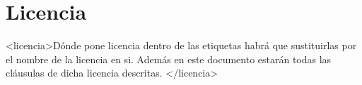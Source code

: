 \chapter{Licencia}
\label{chap:licencia}


<licencia>Dónde pone licencia dentro de las etiquetas habrá que sustituirlas por el nombre de la licencia en si. Además en este documento estarán todas las cláusulas de dicha licencia descritas. </licencia>
